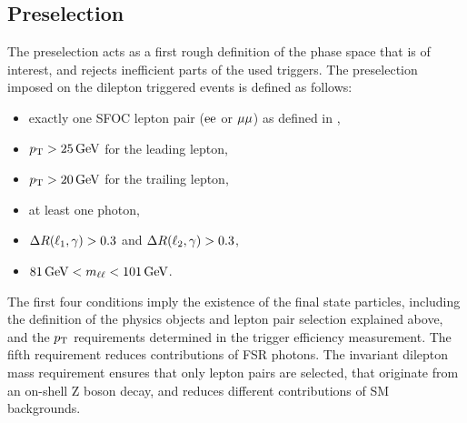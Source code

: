 \subsection{Preselection}
The preselection acts as a first rough definition of the phase space that is of interest, and rejects inefficient parts of the used triggers. The preselection imposed on the dilepton triggered events is defined as follows:
\begin{itemize}
 \item exactly one SFOC lepton pair ($\mathrm{e}\mathrm{e}$ or $\mu\mu$) as defined in ,
 \item $p_{\mathrm{T}}>25\,\text{Ge\hspace{-.08em}V}$ for the leading lepton,
 \item $p_{\mathrm{T}}>20\,\text{Ge\hspace{-.08em}V}$ for the trailing lepton,
 \item at least one photon,
 \item $\Delta R(\ell_1,\gamma)>0.3$ and $\Delta R(\ell_2,\gamma)>0.3$,
 \item $81\,\text{Ge\hspace{-.08em}V}<m_{\ell\ell}<101\,\text{Ge\hspace{-.08em}V}$.
\end{itemize}
The first four conditions imply the existence of the final state particles, including the definition of the physics objects and lepton pair selection explained above, and the $p_{\mathrm{T}}$ requirements determined in the trigger efficiency measurement. The fifth requirement reduces contributions of FSR photons. The invariant dilepton mass requirement ensures that only lepton pairs are selected, that originate from an on-shell Z boson decay, and reduces different contributions of SM backgrounds.
